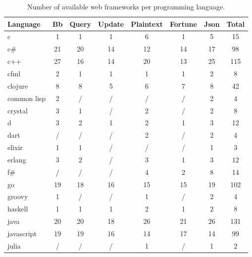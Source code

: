 \begin{table*}
    \caption{Number of available web frameworks per programming language.}
    \label{table:frameworks_count}
    \small
    \center
    \begin{tabular}{l|c|c|c|c|c|c|c}
        \toprule
        Language    & Bb  & Query & Update & Plaintext & Fortune & Json & Total \\
        \midrule
        c           & 1   & 1     & 1      & 6         & 1       & 5    & 15    \\
        c\#         & 21  & 20    & 14     & 12        & 14      & 17   & 98    \\
        c++         & 27  & 16    & 14     & 20        & 13      & 25   & 115   \\
        cfml        & 2   & 1     & 1      & 1         & 1       & 2    & 8     \\
        clojure     & 8   & 8     & 5      & 6         & 7       & 8    & 42    \\
        common lisp & 2   & /     & /      & /         & /       & 2    & 4     \\
        crystal     & 3   & 1     & /      & 2         & /       & 2    & 8     \\
        d           & 3   & 2     & 1      & 2         & 1       & 3    & 12    \\
        dart        & /   & /     & /      & 2         & /       & 2    & 4     \\
        elixir      & 1   & 1     & /      & /         & /       & 1    & 3     \\
        erlang      & 3   & 2     & /      & 3         & 1       & 3    & 12    \\
        f\#         & /   & /     & /      & 4         & 2       & 8    & 14    \\
        go          & 19  & 18    & 16     & 15        & 15      & 19   & 102   \\
        groovy      & 1   & /     & /      & 1         & /       & 2    & 4     \\
        haskell     & 1   & 1     & 1      & 2         & 1       & 2    & 8     \\
        java        & 20  & 20    & 18     & 26        & 21      & 26   & 131   \\
        javascript  & 19  & 19    & 16     & 14        & 17      & 14   & 99    \\
        julia       & /   & /     & /      & 1         & /       & 1    & 2     \\

\end{tabular}
\end{table*}
